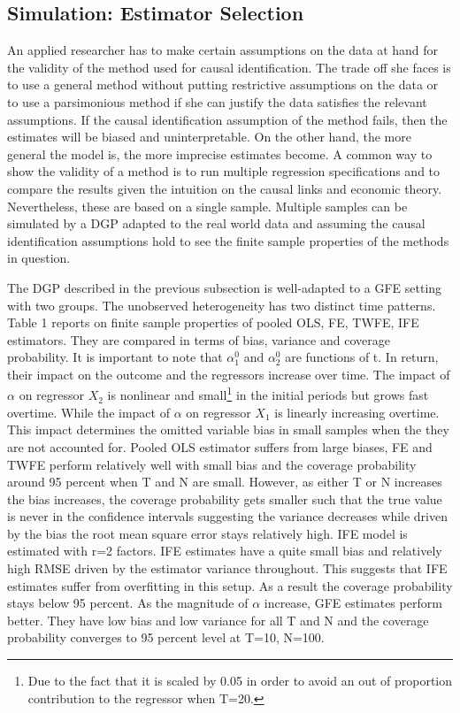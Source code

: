 \subsection{Simulation: Estimator Selection}
An applied researcher has to make certain assumptions on the data at hand for the validity of the method used for causal identification. The trade off she faces is to use a general method without putting restrictive assumptions on the data or to use a parsimonious method if she can justify the data satisfies the relevant assumptions. If the causal identification assumption of the method fails, then the estimates will be biased and uninterpretable. On the other hand, the more general the model is, the more imprecise estimates become.
A common way to show the validity of a method is to run multiple regression specifications and to compare the results given the intuition on the causal links and economic theory. Nevertheless, these are based on a single sample.
Multiple samples can be simulated by a DGP adapted to the real world data and assuming the causal identification assumptions hold to see the finite sample properties of the methods in question.

The DGP described in the previous subsection is well-adapted to a GFE setting with two groups. The unobserved heterogeneity has two distinct time patterns. Table 1 reports on finite sample properties of pooled OLS, FE, TWFE, IFE estimators. They are compared in terms of bias, variance and coverage probability.
It is important to note that $\alpha_1^0$ and $\alpha_2^0$ are functions of t. In return, their impact on the outcome and the regressors increase over time.  The impact of $\alpha$ on regressor $X_2$ is nonlinear and small\footnote{Due to the fact that it is scaled by 0.05 in order to avoid an out of proportion contribution to the regressor when T=20.} in the initial periods but grows fast overtime. While the impact of $\alpha$ on regressor $X_1$ is linearly increasing overtime. This impact determines the omitted variable bias in small samples when the they are not accounted for. Pooled OLS estimator suffers from large biases, FE and TWFE perform relatively well with small bias and the coverage probability around 95 percent when T and N are small. However, as either T or N increases the bias increases, the coverage probability gets smaller such that the true value is never in the confidence intervals suggesting the variance decreases while driven by the bias the root mean square error stays relatively high. IFE model is estimated with r=2 factors. IFE estimates have a quite small bias and relatively high RMSE driven by the estimator variance throughout. This suggests that IFE estimates suffer from overfitting in this setup. As a result the coverage probability stays below 95 percent.
As the magnitude of $\alpha$ increase, GFE estimates perform better. They have low bias and low variance for all T and N and the coverage probability converges to 95 percent level at T=10,  N=100. 
